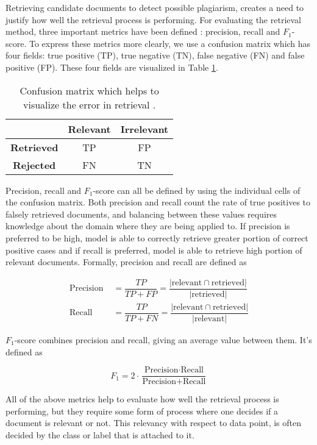 Retrieving candidate documents to detect possible plagiarism, creates a need to justify how well the retrieval process is performing. For evaluating the retrieval method, three important metrics have been defined \cite{Manning:2008:IIR:1394399}: precision, recall and $F_1$-score. To express these metrics more clearly, we use a confusion matrix which has four fields: true positive (TP), true negative (TN), false negative (FN) and false positive (FP). These four fields are visualized in Table \ref{tbl-confmatr-orig}.


\begin{table}[ht]
\centering
\caption{Confusion matrix which helps to visualize the error in retrieval \cite{Manning:2008:IIR:1394399}.}
\label{tbl-confmatr-orig}
\begin{tabular}{c|c|c}
          & \bf Relevant & \bf Irrelevant \\ \hline
\bf Retrieved & TP      & FP        \\
\bf Rejected  & FN      & TN       
\end{tabular}
\end{table}

\noindent
Precision, recall and $F_1$-score can all be defined by using the individual cells of the confusion matrix. Both precision and recall count the rate of true positives to falsely retrieved documents, and balancing between these values requires knowledge about the domain where they are being applied to. If precision is preferred to be high, model is able to correctly retrieve greater portion of correct positive cases and if recall is preferred, model is able to retrieve high portion of relevant documents. Formally, precision and recall are defined as

\begin{align}
    \text{Precision } &= \dfrac{TP}{TP + FP} = \dfrac{|\text{relevant} \cap \text{retrieved}|}{|\text{retrieved}|}\\
    \text{Recall } &= \dfrac{TP}{TP + FN} = \dfrac{|\text{relevant} \cap \text{retrieved}|}{|\text{relevant}|}
\end{align}

$F_1$-score combines precision and recall, giving an average value between them. It's defined as

\begin{equation}
    F_1 = 2 \cdot \dfrac{\text{Precision} \cdot \text{Recall}}{\text{Precision} + \text{Recall}}
\end{equation}

All of the above metrics help to evaluate how well the retrieval process is performing, but they require some form of process where one decides if a document is relevant or not. This relevancy with respect to data point, is often decided by the class or label that is attached to it.

